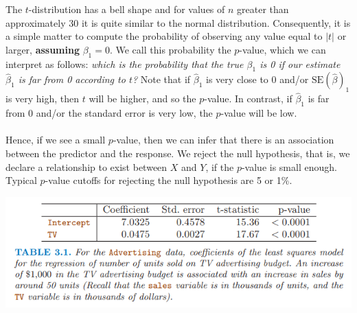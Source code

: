 The $t$-distribution has a bell shape and for values of $n$ greater than approximately 30 it is quite similar to the normal distribution. Consequently, it is a simple matter to compute the probability of observing any value equal to $|t|$ or larger, \textbf{assuming} $\beta_1 = 0$. We call this probability the $p$-value, which we can interpret as follows: \textit{which is the probability that the true $\beta_1$ is 0 if our estimate $\hat{\beta}_1$ is far from 0 according to $t$?} Note that if $\hat{\beta}_1$ is very close to 0 and/or $\text{SE}(\hat{\beta})_1$ is very high, then $t$ will be higher, and so the $p$-value. In contrast, if $\hat{\beta}_1$ is far from 0 and/or the standard error is very low, the $p$-value will be low.
\\\\
Hence, if we see a small $p$-value, then we can infer that there is an association between the predictor and the response. We reject the null hypothesis, that is, we declare a relationship to exist between $X$ and $Y$, if the $p$-value is small enough. Typical $p$-value cutoffs for rejecting the null hypothesis are 5 or 1\%.
\begin{center}
    \includegraphics[scale=0.8]{images/p-value table.png}
\end{center}

